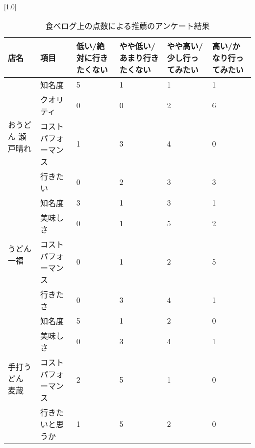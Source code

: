 \begin{table}[H]
\centering
\caption{食べログ上の点数による推薦のアンケート結果}
\label{table:questionnaire:rank}
\small
\scalebox{0.7}[1.0]{
\begin{tabular}{|l|l|l|l|l|l|}
\hline
店名 & 項目 & 低い/絶対に行きたくない & やや低い/あまり行きたくない & やや高い/少し行ってみたい & 高い/かなり行ってみたい \\ \hline
\multirow{4}{*}{おうどん 瀬戸晴れ} & 知名度 & 5 & 1 & 1 & 1 \\ \cline{2-6}
 & クオリティ & 0 & 0 & 2 & 6 \\ \cline{2-6}
 & コストパフォーマンス & 1 & 3 & 4 & 0 \\ \cline{2-6}
 & 行きたい & 0 & 2 & 3 & 3 \\ \hline
\multirow{4}{*}{うどん 一福} & 知名度 & 3 & 1 & 3 & 1 \\ \cline{2-6}
 & 美味しさ & 0 & 1 & 5 & 2 \\ \cline{2-6}
 & コストパフォーマンス & 0 & 1 & 2 & 5 \\ \cline{2-6}
 & 行きたさ & 0 & 3 & 4 & 1 \\ \hline
\multirow{4}{*}{手打うどん 麦蔵} & 知名度 & 5 & 1 & 2 & 0 \\ \cline{2-6}
 & 美味しさ & 0 & 3 & 4 & 1 \\ \cline{2-6}
 & コストパフォーマンス & 2 & 5 & 1 & 0 \\ \cline{2-6}
 & 行きたいと思うか & 1 & 5 & 2 & 0 \\ \hline
\end{tabular}
}
\end{table}
